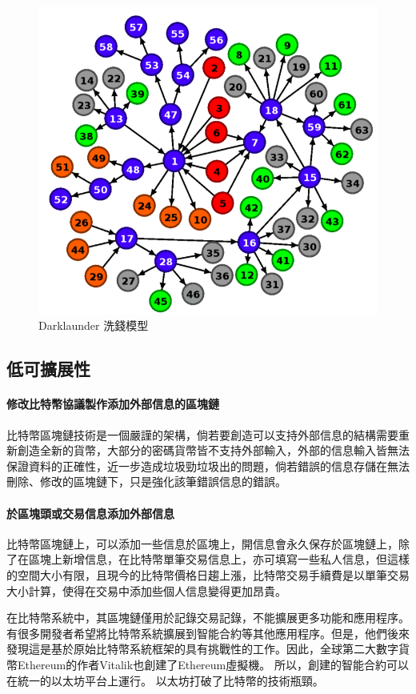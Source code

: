 			\begin{figure}[h]
				\centering
				\includegraphics[width = .7\textwidth]{Darklaunderworkflow.png}
				\caption{Darklaunder 洗錢模型\supercite{AnAnalysisofBitcoinLaundryServices}}\label{Darklaunderworkflow}
			\end{figure}

		\subsection{低可擴展性}
		\paragraph{修改比特幣協議製作添加外部信息的區塊鏈}比特幣區塊鏈技術是一個嚴謹的架構，倘若要創造可以支持外部信息的結構需要重新創造全新的貨幣，大部分的密碼貨幣皆不支持外部輸入，外部的信息輸入皆無法保證資料的正確性，近一步造成垃圾勁垃圾出的問題，倘若錯誤的信息存儲在無法刪除、修改的區塊鏈下，只是強化該筆錯誤信息的錯誤。
		\paragraph{於區塊頭或交易信息添加外部信息} 比特幣區塊鏈上，可以添加一些信息於區塊上，開信息會永久保存於區塊鏈上，除了在區塊上新增信息，在比特幣單筆交易信息上，亦可填寫一些私人信息，但這樣的空間大小有限，且現今的比特幣價格日趨上漲，比特幣交易手續費是以單筆交易大小計算，使得在交易中添加些個人信息變得更加昂貴。

		在比特幣系統中，其區塊鏈僅用於記錄交易記錄，不能擴展更多功能和應用程序。有很多開發者希望將比特幣系統擴展到智能合約等其他應用程序。但是，他們後來發現這是基於原始比特幣系統框架的具有挑戰性的工作。因此，全球第二大數字貨幣Ethereum的作者Vitalik也創建了Ethereum虛擬機。 所以，創建的智能合約可以在統一的以太坊平台上運行。 以太坊打破了比特幣的技術瓶頸。

